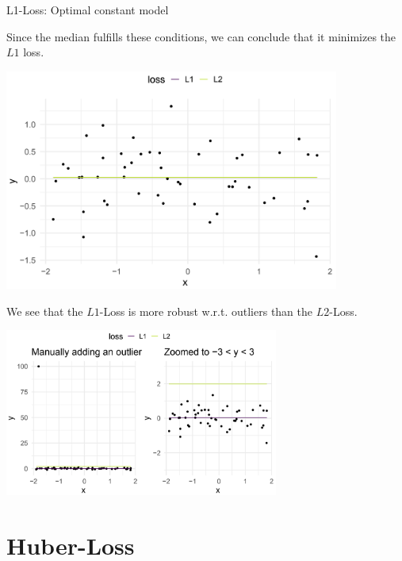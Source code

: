 \begin{vbframe}{L1-Loss: Optimal constant model}
\begin{itemize}
  Since the median fulfills these conditions, we can conclude that it minimizes 
  the $L1$ loss.
\end{itemize}

\framebreak


\begin{center}
\includegraphics[width = 11cm ]{figure_man/L1-loss.png} \\
\end{center}

\framebreak 

We see that the $L1$-Loss is more robust w.r.t. outliers than the $L2$-Loss. 
\vspace{0.3cm}


\begin{center}
\includegraphics[width = 9cm ]{figure_man/L1andL2-loss.png} \\
\end{center}


\end{vbframe}



\section{Huber-Loss}


